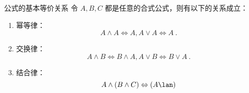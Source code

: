 
\begin{theorem}{公式的基本等价关系}
令 $A, B, C$ 都是任意的合式公式，则有以下的关系成立：
\begin{enumerate}
\item 幂等律：
\begin{equation}
A \land A \Leftrightarrow A, A \lor A \Leftrightarrow A~.
\end{equation}
\item 交换律：
\begin{equation}
A \land B \Leftrightarrow B \land A, A \lor B \Leftrightarrow B \lor A ~.
\end{equation}
\item 结合律：
\begin{equation}
A \land (B \land C) \Leftrightarrow (A \lan)
\end{equation}

\end{enumerate}
\end{theorem}